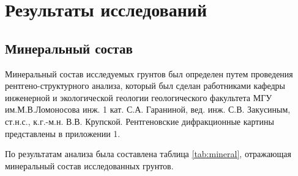 \chapter{Результаты исследований}\label{ch:ch7}

\section{Минеральный состав}

Минеральный состав исследуемых грунтов был определен путем проведения рентгено-структурного 
анализа, который был сделан работниками кафедры  инженерной и экологической геологии 
геологического факультета МГУ им.М.В.Ломоносова
инж. 1 кат. С.А. Гараниной, вед. инж. С.В. Закусиным, ст.н.с., к.г.-м.н. В.В. Крупской.
Рентгеновские дифракционные картины представлены в приложении 1.

По результатам анализа была составлена таблица \ref{tab:mineral}, отражающая минеральный состав 
исследованных грунтов.


